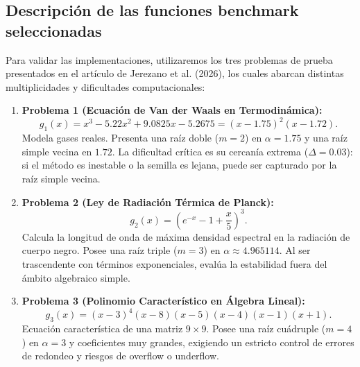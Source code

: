 ﻿\documentclass[10pt, a4paper]{article}
\begin{document}
\subsection{Descripción de las funciones benchmark seleccionadas}
Para validar las implementaciones, utilizaremos los tres problemas de prueba presentados en el artículo de Jerezano et al. (2026), los cuales abarcan distintas multiplicidades y dificultades computacionales:
\begin{enumerate}
    \item \textbf{Problema 1 (Ecuación de Van der Waals en Termodinámica):}
    \begin{equation}
        g_1(x) = x^3 - 5.22 x^2 + 9.0825 x - 5.2675 = (x - 1.75)^2 (x - 1.72).
    \end{equation}
    Modela gases reales. Presenta una raíz doble ($m=2$) en $\alpha = 1.75$ y una raíz simple vecina en $1.72$. La dificultad crítica es su cercanía extrema ($\Delta = 0.03$): si el método es inestable o la semilla es lejana, puede ser capturado por la raíz simple vecina.
    \item \textbf{Problema 2 (Ley de Radiación Térmica de Planck):}
    \begin{equation}
        g_2(x) = \left( e^{-x} - 1 + \frac{x}{5} \right)^3.
    \end{equation}
    Calcula la longitud de onda de máxima densidad espectral en la radiación de cuerpo negro. Posee una raíz triple ($m=3$) en $\alpha \approx 4.965114$. Al ser trascendente con términos exponenciales, evalúa la estabilidad fuera del ámbito algebraico simple.
    \item \textbf{Problema 3 (Polinomio Característico en Álgebra Lineal):}
    \begin{equation}
        g_3(x) = (x - 3)^4 (x - 8)(x - 5)(x - 4)(x - 1)(x + 1).
    \end{equation}
    Ecuación característica de una matriz $9 \times 9$. Posee una raíz cuádruple ($m=4$) en $\alpha = 3$ y coeficientes muy grandes, exigiendo un estricto control de errores de redondeo y riesgos de overflow o underflow.
\end{enumerate}
\end{document}
